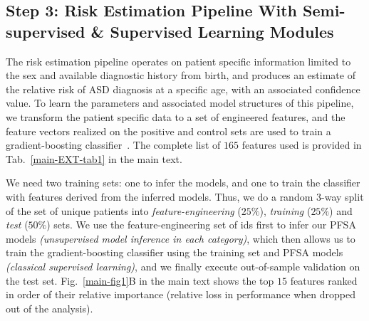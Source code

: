\documentclass[onecolumn,,10pt]{IEEEtran}
\gdef\treatment{positive\xspace}
\begin{document}
\subsection{Step 3: Risk Estimation Pipeline With Semi-supervised \& Supervised Learning Modules}
The risk estimation pipeline operates on patient specific information limited to the sex and available  diagnostic history from birth, and produces an estimate of the relative risk of ASD diagnosis at a specific age, with an associated  confidence value. To learn the parameters and associated model structures of  this pipeline, we transform the patient specific data to a set of engineered features, and the feature vectors realized on the
\treatment and control sets are  used to train a gradient-boosting classifier~\cite{friedman}. The complete list of $165$ features used  is provided in Tab.~\ref{main-EXT-tab1} in the main text.

We need two training sets: one to infer the models, and one to  train the classifier  with features  derived  from the inferred models. Thus, we do a random 3-way split of the set of unique patients into \textit{feature-engineering} ($25\%$), \textit{training} ($25\%$) and \textit{test} ($50\%$) sets. We use the feature-engineering set of ids first to infer our PFSA models \textit{(unsupervised model inference in each category)}, which then allows us to train the gradient-boosting classifier using the training set and PFSA models \textit{(classical supervised learning)}, and we finally execute  out-of-sample validation on the test set. Fig.~\ref{main-fig1}B in the main text shows the top $15$ features  ranked in order of their relative importance (relative loss in performance when dropped out of the analysis). 
\end{document}
